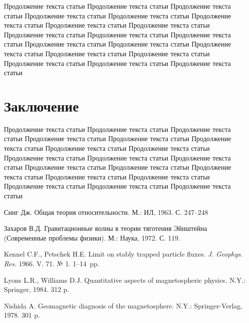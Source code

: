 Продолжение текста статьи Продолжение текста статьи Продолжение текста статьи Продолжение текста статьи Продолжение текста статьи Продолжение текста статьи Продолжение текста статьи Продолжение текста статьи Продолжение текста статьи Продолжение текста статьи Продолжение текста статьи Продолжение текста статьи Продолжение текста статьи Продолжение текста статьи Продолжение текста статьи Продолжение текста статьи Продолжение текста статьи Продолжение текста статьи Продолжение текста статьи 

\section*{Заключение}

Продолжение текста статьи Продолжение текста статьи Продолжение текста статьи Продолжение текста статьи Продолжение текста статьи Продолжение текста статьи Продолжение текста статьи Продолжение текста статьи Продолжение текста статьи Продолжение текста статьи Продолжение текста статьи Продолжение текста статьи Продолжение текста статьи Продолжение текста статьи Продолжение текста статьи Продолжение текста статьи Продолжение текста статьи Продолжение текста статьи Продолжение текста статьи 



\begin{thebibliography}{99}

Синг Дж. 
Общая теория относительности. 
М.: ИЛ, 1963. С. 247--248 

Захаров В.Д. 
Гравитационные волны в теории тяготения Эйнштейна (Современные проблемы физики). 
М.: Наука, 1972. С. 119.

Kennel C.F., Petschek H.E. 
Limit on stably trapped particle fluxes. 
{\it J. Geophys. Res.} 1966. V. 71. № 1. 1--14~pp.

Lyons L.R., Williams D.J. 
Quantitative aspects of magnetospheric physics. 
N.Y.: Springer, 1984. 312 p.

Nishida A. Geomagnetic diagnosis of the magnetosphere. 
N.Y.: Springer-Verlag, 1978. 301 p.

\end{thebibliography}


